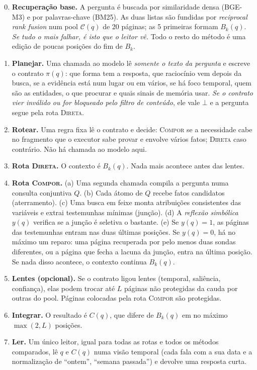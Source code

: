 \documentclass[11pt]{article}
\newcommand{\Compose}{\textsc{Compor}}
\newcommand{\Direct}{\textsc{Direta}}
\begin{document}
\begin{enumerate}[label=\textbf{Passo \arabic*.}, leftmargin=*, align=left]
\setcounter{enumi}{-1}
\item \textbf{Recuperação base.} A pergunta é buscada por similaridade densa
(BGE-M3) e por palavras-chave (BM25). As duas listas são fundidas por
\emph{reciprocal rank fusion} num pool $\mathcal{C}(q)$ de 20 páginas; as 5
primeiras formam $B_k(q)$. \emph{Se tudo o mais falhar, é isto que o leitor
vê.} Todo o resto do método é uma edição de poucas posições do fim de $B_k$.

\item \textbf{Planejar.} Uma chamada ao modelo lê \emph{somente o texto da
pergunta} e escreve o contrato $\pi(q)$: que forma tem a resposta, que
raciocínio vem depois da busca, se a evidência está num lugar ou em vários, se
há foco temporal, quem são as entidades, o que procurar e quais sinais de
memória usar. \emph{Se o contrato vier inválido ou for bloqueado pelo filtro
de conteúdo}, ele vale $\bot$ e a pergunta segue pela rota \Direct{}.

\item \textbf{Rotear.} Uma regra fixa lê o contrato e decide: \Compose{} se a
necessidade cabe no fragmento que o executor sabe provar e envolve vários
fatos; \Direct{} caso contrário. Não há chamada ao modelo aqui.

\item \textbf{Rota \Direct{}.} O contexto é $B_k(q)$. Nada mais acontece antes
das lentes.

\item \textbf{Rota \Compose{}.} (a) Uma segunda chamada compila a pergunta
numa consulta conjuntiva $Q$. (b) Cada átomo de $Q$ recebe fatos candidatos
(aterramento). (c) Uma busca em feixe monta atribuições consistentes das
variáveis e extrai testemunhas mínimas (junção). (d) A \emph{reflexão
simbólica} $y(q)$ verifica se a junção é seletiva o bastante. (e) Se $y(q)=1$,
as páginas das testemunhas entram nas duas últimas posições. Se $y(q)=0$, há
no máximo um reparo: uma página recuperada por pelo menos duas sondas
diferentes, ou a página que fecha a lacuna da junção, entra na última
posição. Se nada disso acontece, o contexto continua $B_k(q)$.

\item \textbf{Lentes (opcional).} Se o contrato ligou lentes (temporal,
saliência, confiança), elas podem trocar até $L$ páginas não protegidas da
cauda por outras do pool. Páginas colocadas pela rota \Compose{} são
protegidas.

\item \textbf{Integrar.} O resultado é $C(q)$, que difere de $B_k(q)$ em no
máximo $\max(2,L)$ posições.

\item \textbf{Ler.} Um único leitor, igual para todas as rotas e todos os
métodos comparados, lê $q$ e $C(q)$ numa visão temporal (cada fala com a sua
data e a normalização de ``ontem'', ``semana passada'') e devolve uma
resposta curta.
\end{enumerate}
\end{document}
